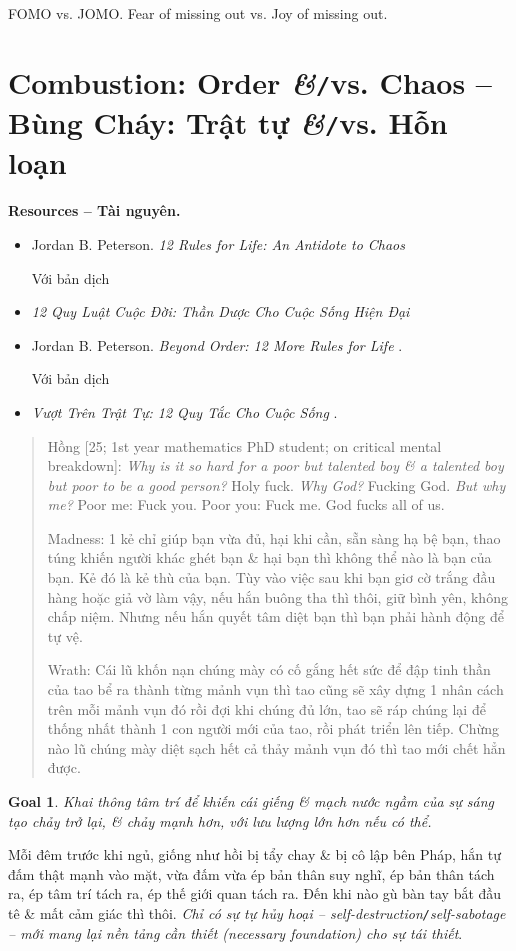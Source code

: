 \documentclass[12pt]{article}
\newtheorem{goal}{Goal}
\begin{document}
FOMO vs. JOMO. Fear of missing out vs. Joy of missing out.


\section{Combustion: Order {\it\&}{\tt/}vs. Chaos -- Bùng Cháy: Trật tự {\it\&}{\tt/}vs. Hỗn loạn}
\noindent\textbf{\textsf{Resources -- Tài nguyên.}}
\begin{itemize}
	\item {\sc Jordan B. Peterson}. {\it 12 Rules for Life: An Antidote to Chaos} \cite{Peterson2018}
	
	Với bản dịch
	\item {\it 12 Quy Luật Cuộc Đời: Thần Dược Cho Cuộc Sống Hiện Đại} \cite{Peterson2022a}
	\item {\sc Jordan B. Peterson}. {\it Beyond Order: 12 More Rules for Life} \cite{Peterson2021}.
	
	Với bản dịch 
	\item {\it Vượt Trên Trật Tự: 12 Quy Tắc Cho Cuộc Sống} \cite{Peterson2022b}.
\end{itemize}

\begin{quote}
	{\sf Hồng [25; 1st year mathematics PhD student; on critical mental breakdown]}: {\it Why is it so hard for a poor but talented boy \& a talented boy but poor to be a good person?} Holy fuck. {\it Why God?} Fucking God. {\it But why me?} Poor me: Fuck you. Poor you: Fuck me. God fucks all of us.
	
	{\sf Madness}: 1 kẻ chỉ giúp bạn vừa đủ, hại khi cần, sẵn sàng hạ bệ bạn, thao túng khiến người khác ghét bạn \& hại bạn thì không thể nào là bạn của bạn. Kẻ đó là kẻ thù của bạn. Tùy vào việc sau khi bạn giơ cờ trắng đầu hàng hoặc giả vờ làm vậy, nếu hắn buông tha thì thôi, giữ bình yên, không chấp niệm. Nhưng nếu hắn quyết tâm diệt bạn thì bạn phải hành động để tự vệ.
	
	{\sf Wrath}: Cái lũ khốn nạn chúng mày có cố gắng hết sức để đập tinh thần của tao bể ra thành từng mảnh vụn thì tao cũng sẽ xây dựng 1 nhân cách trên mỗi mảnh vụn đó rồi đợi khi chúng đủ lớn, tao sẽ ráp chúng lại để thống nhất thành 1 con người mới của tao, rồi phát triển lên tiếp. Chừng nào lũ chúng mày diệt sạch hết cả thảy mảnh vụn đó thì tao mới chết hẳn được.
\end{quote}

\begin{goal}
	Khai thông tâm trí để khiến cái giếng \& mạch nước ngầm của sự sáng tạo chảy trở lại, \& chảy mạnh hơn, với lưu lượng lớn hơn nếu có thể.
\end{goal}
Mỗi đêm trước khi ngủ, giống như hồi bị tẩy chay \& bị cô lập bên Pháp, hắn tự đấm thật mạnh vào mặt, vừa đấm vừa ép bản thân suy nghĩ, ép bản thân tách ra, ép tâm trí tách ra, ép thế giới quan tách ra. Đến khi nào gù bàn tay bắt đầu tê \& mất cảm giác thì thôi. {\it Chỉ có sự tự hủy hoại -- self-destruction{\tt/}self-sabotage -- mới mang lại nền tảng cần thiết (necessary foundation) cho sự tái thiết}.
\end{document}
